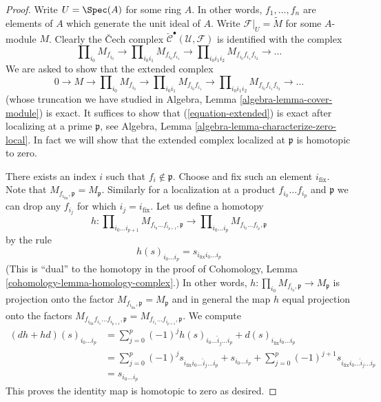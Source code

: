 \begin{proof}
Write $U = \Spec(A)$ for some ring $A$.
In other words, $f_1, \ldots, f_n$ are elements of $A$
which generate the unit ideal of $A$.
Write $\mathcal{F}|_U = \widetilde{M}$ for some $A$-module $M$.
Clearly the {\v C}ech complex
$\check{\mathcal{C}}^\bullet(\mathcal{U}, \mathcal{F})$
is identified with the complex
$$
\prod\nolimits_{i_0} M_{f_{i_0}} \to
\prod\nolimits_{i_0i_1} M_{f_{i_0}f_{i_1}} \to
\prod\nolimits_{i_0i_1i_2} M_{f_{i_0}f_{i_1}f_{i_2}} \to
\ldots
$$
We are asked to show that the extended complex
\begin{equation}
\label{equation-extended}
0 \to
M \to
\prod\nolimits_{i_0} M_{f_{i_0}} \to
\prod\nolimits_{i_0i_1} M_{f_{i_0}f_{i_1}} \to
\prod\nolimits_{i_0i_1i_2} M_{f_{i_0}f_{i_1}f_{i_2}} \to
\ldots
\end{equation}
(whose truncation we have studied in
Algebra, Lemma \ref{algebra-lemma-cover-module}) is exact.
It suffices to show that (\ref{equation-extended})
is exact after localizing at a prime $\mathfrak p$, see
Algebra, Lemma \ref{algebra-lemma-characterize-zero-local}.
In fact we will show that the extended complex localized
at $\mathfrak p$ is homotopic to zero.

\medskip\noindent
There exists an index $i$ such that $f_i \not \in \mathfrak p$.
Choose and fix such an element $i_{\text{fix}}$. Note that
$M_{f_{i_{\text{fix}}}, \mathfrak p} = M_{\mathfrak p}$. Similarly
for a localization at a product $f_{i_0} \ldots f_{i_p}$ and $\mathfrak p$
we can drop any $f_{i_j}$ for which $i_j = i_{\text{fix}}$.
Let us define a homotopy
$$
h :
\prod\nolimits_{i_0 \ldots i_{p + 1}}
M_{f_{i_0} \ldots f_{i_{p + 1}}, \mathfrak p}
\longrightarrow
\prod\nolimits_{i_0 \ldots i_p}
M_{f_{i_0} \ldots f_{i_p}, \mathfrak p}
$$
by the rule
$$
h(s)_{i_0 \ldots i_p} = s_{i_{\text{fix}} i_0 \ldots i_p}
$$
(This is ``dual'' to the homotopy in the proof of
Cohomology, Lemma \ref{cohomology-lemma-homology-complex}.)
In other words, $h : \prod_{i_0} M_{f_{i_0}, \mathfrak p} \to M_\mathfrak p$
is projection onto the factor
$M_{f_{i_{\text{fix}}}, \mathfrak p} = M_{\mathfrak p}$ and in general
the map $h$ equal projection onto the factors
$M_{f_{i_{\text{fix}}} f_{i_1} \ldots f_{i_{p + 1}}, \mathfrak p}
= M_{f_{i_1} \ldots f_{i_{p + 1}}, \mathfrak p}$. We compute
\begin{align*}
(dh + hd)(s)_{i_0 \ldots i_p}
& =
\sum\nolimits_{j = 0}^p
(-1)^j
h(s)_{i_0 \ldots \hat i_j \ldots i_p}
+
d(s)_{i_{\text{fix}} i_0 \ldots i_p}\\
& =
\sum\nolimits_{j = 0}^p
(-1)^j
s_{i_{\text{fix}} i_0 \ldots \hat i_j \ldots i_p}
+
s_{i_0 \ldots i_p}
+
\sum\nolimits_{j = 0}^p
(-1)^{j + 1}
s_{i_{\text{fix}} i_0 \ldots \hat i_j \ldots i_p} \\
& =
s_{i_0 \ldots i_p}
\end{align*}
This proves the identity map is homotopic to zero as desired.
\end{proof}

